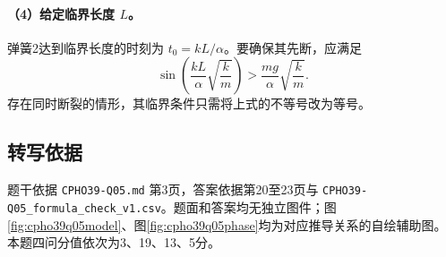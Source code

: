 \paragraph{（4）给定临界长度 $L$。}
弹簧2达到临界长度的时刻为 $t_0=kL/\alpha$。要确保其先断，应满足
\[
\boxed{\sin\left(\frac{kL}{\alpha}\sqrt{\frac{k}{m}}\right)
>\frac{mg}{\alpha}\sqrt{\frac{k}{m}}.}
\]
存在同时断裂的情形，其临界条件只需将上式的不等号改为等号。

\subsection{转写依据}
题干依据 \texttt{CPHO39-Q05.md} 第3页，答案依据第20至23页与 \texttt{CPHO39-Q05\_formula\_check\_v1.csv}。题面和答案均无独立图件；图\ref{fig:cpho39q05model}、图\ref{fig:cpho39q05phase}均为对应推导关系的自绘辅助图。本题四问分值依次为3、19、13、5分。
